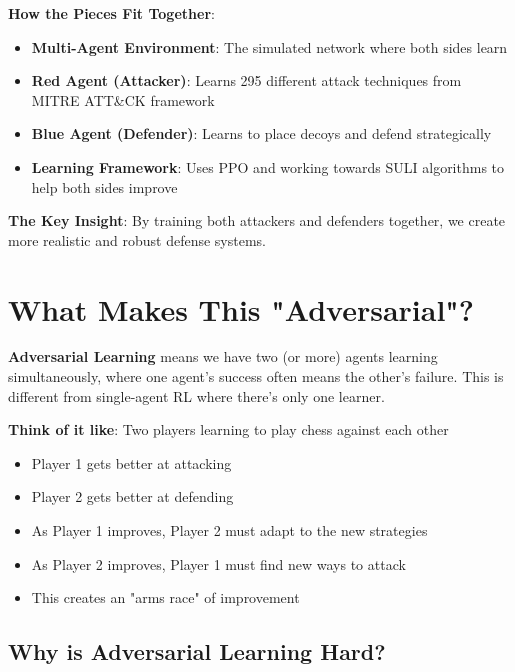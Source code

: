 \documentclass[11pt]{article}
\begin{document}
\begin{intuition}
\textbf{How the Pieces Fit Together}:
\begin{itemize}
\item \textbf{Multi-Agent Environment}: The simulated network where both sides learn
\item \textbf{Red Agent (Attacker)}: Learns 295 different attack techniques from MITRE ATT\&CK framework
\item \textbf{Blue Agent (Defender)}: Learns to place decoys and defend strategically  
\item \textbf{Learning Framework}: Uses PPO and working towards SULI algorithms to help both sides improve
\end{itemize}

\textbf{The Key Insight}: By training both attackers and defenders together, we create more realistic and robust defense systems.
\end{intuition}

\section{What Makes This "Adversarial"?}

\begin{foundation}
\textbf{Adversarial Learning} means we have two (or more) agents learning simultaneously, where one agent's success often means the other's failure. This is different from single-agent RL where there's only one learner.
\end{foundation}

\begin{intuition}
\textbf{Think of it like}: Two players learning to play chess against each other
\begin{itemize}
\item Player 1 gets better at attacking
\item Player 2 gets better at defending  
\item As Player 1 improves, Player 2 must adapt to the new strategies
\item As Player 2 improves, Player 1 must find new ways to attack
\item This creates an "arms race" of improvement
\end{itemize}
\end{intuition}

\subsection{Why is Adversarial Learning Hard?}
\end{document}
